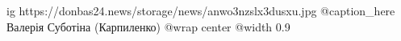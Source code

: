  
 
 
 
 

\ifcmt
  ig https://donbas24.news/storage/news/anwo3nzslx3dusxu.jpg
	@caption_here Валерія Суботіна (Карпиленко)
  @wrap center
  @width 0.9
\fi
